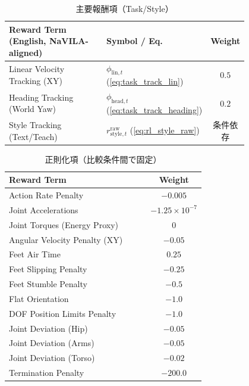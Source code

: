 \begin{table}[H]
  \centering
  \caption{主要報酬項（Task/Style）}
  \label{tab:reward_main}
  \footnotesize
  \setlength{\tabcolsep}{4pt}
  \begin{tabular}{>{\raggedright\arraybackslash}p{0.46\linewidth} >{\raggedright\arraybackslash}p{0.34\linewidth} c} \toprule
    \textbf{Reward Term (English, NaVILA-aligned)} & \textbf{Symbol / Eq.} & \textbf{Weight} \\ \midrule
    Linear Velocity Tracking (XY) & $\phi_{\mathrm{lin},t}$ (\eqref{eq:task_track_lin}) & $0.5$ \\
    Heading Tracking (World Yaw) & $\phi_{\mathrm{head},t}$ (\eqref{eq:task_track_heading}) & $0.2$ \\
    Style Tracking (Text/Teach) & $r_{\mathrm{style},t}^{\mathrm{raw}}$ (\eqref{eq:rl_style_raw}) & 条件依存 \\ \bottomrule
  \end{tabular}
\end{table}

\begin{table}[H]
  \centering
  \caption{正則化項（比較条件間で固定）}
  \label{tab:reward_reg}
  \footnotesize
  \setlength{\tabcolsep}{4pt}
  \begin{tabular}{>{\raggedright\arraybackslash}p{0.72\linewidth} c} \toprule
    \textbf{Reward Term} & \textbf{Weight} \\ \midrule
    Action Rate Penalty & $-0.005$ \\
    Joint Accelerations & $-1.25 \times 10^{-7}$ \\
    Joint Torques (Energy Proxy) & $0$ \\
    Angular Velocity Penalty (XY) & $-0.05$ \\
    Feet Air Time & $0.25$ \\
    Feet Slipping Penalty & $-0.25$ \\
    Feet Stumble Penalty & $-0.5$ \\
    Flat Orientation & $-1.0$ \\
    DOF Position Limits Penalty & $-1.0$ \\
    Joint Deviation (Hip) & $-0.05$ \\
    Joint Deviation (Arms) & $-0.05$ \\
    Joint Deviation (Torso) & $-0.02$ \\
    Termination Penalty & $-200.0$ \\ \bottomrule
  \end{tabular}
\end{table}

